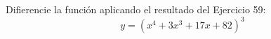 \item Difierencie la función aplicando el resultado del Ejercicio 59:
$$y = (x^4 + 3x^3 + 17x + 82)^3$$
